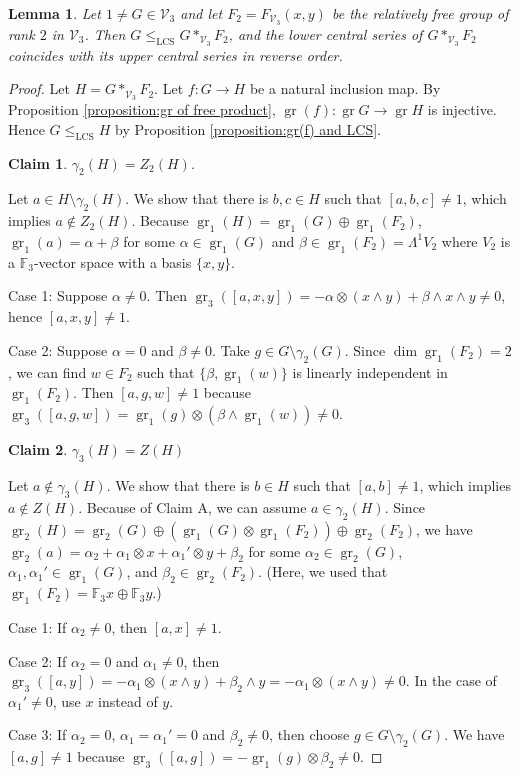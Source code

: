 \documentclass[11pt,reqno]{article}
\newtheorem{lemma}[theorem]{Lemma}
\newtheorem{claim}{Claim}[theorem]
\theoremstyle{definition}
\theoremstyle{remark}
\DeclareMathOperator{\gr}{gr}
\newcommand{\LCS}{\mathrm{LCS}}
\begin{document}
\begin{lemma}\label{lemma:coincidence of central series}
    Let $1\neq G\in \mathcal V_3$ and let $F_2=F_{\mathcal V_3}(x,y)$ be the relatively free group of rank $2$ in $\mathcal V_3$.
    Then $G\leq_{\LCS}G*_{\mathcal V_3}F_2$, and the lower central series of
    $G*_{\mathcal V_3}F_2$ coincides with its upper central series in reverse
    order.
\end{lemma}

\begin{proof}
    Let $H=G*_{\mathcal V_3}F_2$.
    Let $f:G\to H$ be a natural inclusion map. By Proposition \ref{proposition:gr of free product}, $\gr(f):\gr G\to \gr H$ is injective. Hence $G\leq_\LCS H$ by Proposition \ref{proposition:gr(f) and LCS}.

    \begin{claim}
        $\gamma_2(H)=Z_2(H)$.
    \end{claim}
    Let $a\in H\setminus\gamma_2(H)$. We show that there is $b,c\in H$ such that $[a,b,c]\neq 1$, which implies $a\not\in Z_2(H)$.
    Because $\gr_1(H)=\gr_1(G)\oplus \gr_1(F_2)$, $\gr_1(a)=\alpha+\beta$ for some $\alpha\in \gr_1(G)$ and $\beta\in \gr_1(F_2)=\Lambda^1V_2$ where $V_2$ is a $\mathbb F_3$-vector space with a basis $\{x,y\}$.
    
    Case 1: Suppose $\alpha\neq 0$. Then $\gr_3([a,x,y])=-\alpha\otimes (x\wedge y)+\beta\wedge x\wedge y\neq 0$, hence $[a,x,y]\neq 1$.

    Case 2: Suppose $\alpha=0$ and $\beta \neq 0$. 
    Take $g \in G\setminus \gamma_2(G)$. 
    Since $\dim \gr_1(F_2)=2$, we can find  $w\in F_2$ such that $\{\beta, \gr_1(w)\}$ is linearly independent in $\gr_1(F_2)$.
    Then $[a,g,w]\neq 1$ because $\gr_3([a,g,w])=\gr_1(g) \otimes (\beta\wedge \gr_1(w)) \neq 0$.

    \begin{claim}
        $\gamma_3(H)=Z(H)$
    \end{claim}
    Let $a\not\in\gamma_3(H)$. We show that there is $b\in H$ such that $[a,b]\neq 1$, which implies $a\not\in Z(H)$.
    Because of Claim A, we can assume $a\in \gamma_2(H)$.
    Since $\gr_2(H)=\gr_2(G)\oplus (\gr_1(G)\otimes \gr_1(F_2))\oplus \gr_2(F_2)$,
    we have $\gr_2(a)=\alpha_2+ \alpha_1\otimes x+\alpha_1'\otimes y + \beta_2$ for some $\alpha_2\in\gr_2(G)$, $\alpha_1,\alpha_1'\in\gr_1(G)$, and $\beta_2\in\gr_2(F_2)$.
    (Here, we used that $\gr_1(F_2)=\mathbb F_3x\oplus \mathbb F_3 y$.)
    
    Case 1: If $\alpha_2\neq 0$, then $[a,x]\neq 1$.
    
    Case 2: If $\alpha_2=0$ and $\alpha_1\neq 0$, then $\gr_3([a,y])=-\alpha_1\otimes(x\wedge y)+\beta_2\wedge y=-\alpha_1\otimes(x\wedge y)\neq 0$. In the case of $\alpha_1'\neq 0$, use $x$ instead of $y$.

    Case 3: If $\alpha_2=0$, $\alpha_1=\alpha_1'=0$ and $\beta_2\neq 0$, then choose $g\in G\setminus \gamma_2(G)$. We have $[a,g]\neq 1$ because $\gr_3([a,g])=-\gr_1(g)\otimes \beta_2\neq 0$.
\end{proof}
\end{document}
